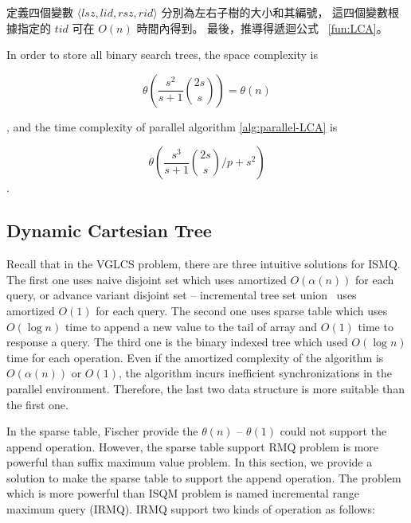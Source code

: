定義四個變數 $\langle\mathit{lsz},\mathit{lid},\mathit{rsz},\mathit{rid}\rangle$ 分別為左右子樹的大小和其編號，
這四個變數根據指定的 $\mathit{tid}$ 可在 $O(n)$ 時間內得到。
最後，推導得遞迴公式 ~\ref{fun:LCA}。 
\fi



In order to store all binary search trees, the space complexity is 

\begin{equation}
\theta\left(\frac{s^2}{s+1} \binom{2s}{s}\right) = \theta\left(n\right)
\end{equation}

, and the time complexity of parallel algorithm \ref{alg:parallel-LCA}
is

\begin{equation}
\theta\left(\frac{s^3}{s+1} \binom{2s}{s} \bigg/ p + s^2 \right)
\end{equation}.

\iffalse
為記錄所有的二元搜尋樹的 LCA，空間消耗 $\theta\left(\frac{s^2}{s+1} \binom{2s}{s}\right) = \theta\left(n\right)$；
其平行算法 \ref{alg:parallel-LCA} 的時間複雜度如下：

\begin{equation}
\theta\left(\frac{s^3}{s+1} \binom{2s}{s} \bigg/ p + s^2 \right)
\end{equation}.
\fi



\subsection{Dynamic Cartesian Tree}

Recall that in the VGLCS problem, there are three intuitive solutions
for ISMQ.  The first one uses naive disjoint set which uses amortized
$O(\alpha(n))$ for each query, or advance variant disjoint set --
incremental tree set union~\cite{Gabow1983ALA} uses amortized $O(1)$ for
each query.  The second one uses sparse table which uses $O(\log n)$
time to append a new value to the tail of array and $O(1)$ time to
response a query.  The third one is the binary indexed tree which used
$O(\log n)$ time for each operation.   Even if the amortized complexity
of the algorithm is $O(\alpha(n))$ or $O(1)$, the algorithm incurs
inefficient synchronizations in the parallel environment. Therefore, the
last two data structure is more suitable than the first one.

In the sparse table, Fischer provide the $\theta(n)$ -- $\theta(1)$
could not support the append operation.  However, the sparse table
support RMQ problem is more powerful than suffix maximum value
problem.  In this section, we provide a solution to make the sparse
table to support the append operation.  The problem which is more
powerful than ISQM problem is named incremental range maximum query
(IRMQ).  IRMQ support two kinds of operation as follows:

